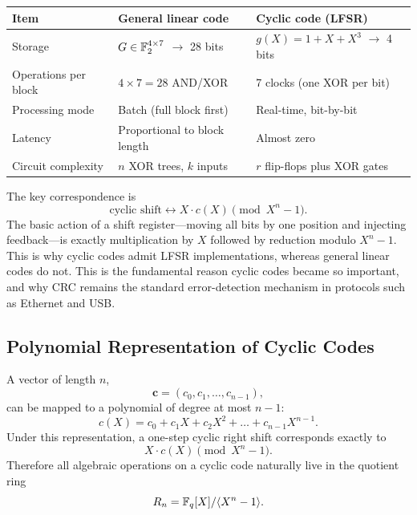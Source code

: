 \begin{example}
\renewcommand{\arraystretch}{1.2}
\begin{center}
\begin{tabular}{@{}p{3cm}p{5.5cm}p{5.5cm}@{}}
	\toprule
	\textbf{Item} & \textbf{General linear code} & \textbf{Cyclic code (LFSR)} \\
	\midrule
	Storage & \(G \in \mathbb{F}_2^{4 \times 7}\) $\to$ 28 bits & \(g(X)=1+X+X^3\) $\to$ 4 bits \\
	Operations per block & \(4 \times 7 = 28\) AND/XOR & 7 clocks (one XOR per bit) \\
	Processing mode & Batch (full block first) & Real-time, bit-by-bit \\
	Latency & Proportional to block length & Almost zero \\
	Circuit complexity & \(n\) XOR trees, \(k\) inputs & \(r\) flip-flops plus XOR gates \\
	\bottomrule
\end{tabular}
\end{center}
\end{example}

\begin{remark}
The key correspondence is
\[\text{cyclic shift} \longleftrightarrow X \cdot c(X) \pmod{X^n-1}.\]
The basic action of a shift register---moving all bits by one position and injecting feedback---is exactly multiplication by \(X\) followed by reduction modulo \(X^n-1\). This is why cyclic codes admit LFSR implementations, whereas general linear codes do not. This is the fundamental reason cyclic codes became so important, and why CRC remains the standard error-detection mechanism in protocols such as Ethernet and USB.
\end{remark}

\newpage
\subsection{Polynomial Representation of Cyclic Codes}

A vector of length \(n\),
\[\mathbf{c}=(c_0,c_1,\dots,c_{n-1}),\]
can be mapped to a polynomial of degree at most \(n-1\):
\[c(X)=c_0 + c_1 X + c_2 X^2 + \dots + c_{n-1}X^{n-1}.\]
Under this representation, a one-step cyclic right shift corresponds exactly to
\[X \cdot c(X) \pmod{X^n-1}.\]
Therefore all algebraic operations on a cyclic code naturally live in the quotient ring
\[R_n = \mathbb{F}_q[X]/\langle X^n-1\rangle.\]

